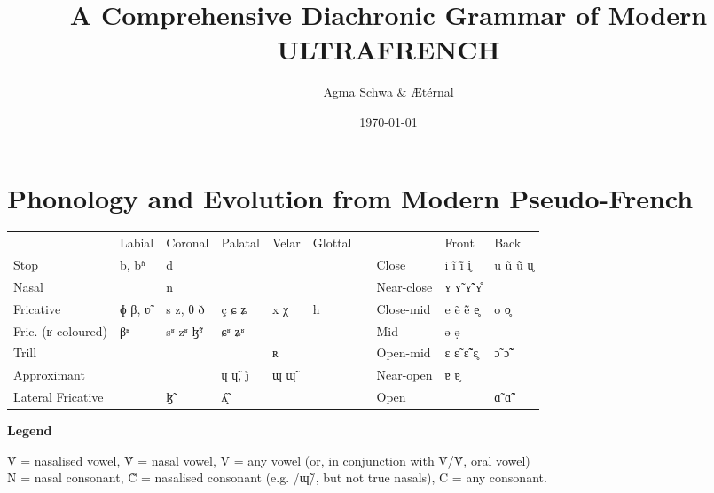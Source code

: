 \documentclass[a4paper, 12pt, oneside, final]{article}
\title{A Comprehensive Diachronic Grammar of Modern ULTRAFRENCH}
\author{Agma Schwa \& Ætérnal}
\date{\today}
\def\parheading#1{\noindent\textbf{#1}}
\let\Sub\textsubscript
\begin{document}
\maketitle
\thispagestyle{empty}
\clearpage
\setcounter{page}{1}

\tableofcontents
\clearpage

\section{Phonology and Evolution from Modern Pseudo-French}\label{sec:phonology}{\def\arraystretch{1.25}\setlength{\tabcolsep}{.4em}
\noindent\begin{tabular}{@{}|l|l|l|l|l|l|l@{\quad}|l|l|l|}                                                   \cline{1-6} \cline{8-10}
                       & Labial & Coronal  & Palatal  & Velar & Glottal &&            & Front        & Back        \\ \cline{1-6} \cline{8-10}
    Stop               & b, bʱ  & d        &          &       &         && Close      & i ĩ ĩ̃ i̥      & u ũ ũ̃ u̥ \\ \cline{1-6} \cline{8-10}
    Nasal              &        & n        &          &       &         && Near-close & ʏ ʏ̃ ʏ̃̃ ʏ̊      &             \\ \cline{1-6} \cline{8-10}
    Fricative          & ɸ β, ʋ̃ & s z, θ ð & ç ɕ ʑ    & x χ   & h       && Close-mid  & e ẽ ẽ̃ e̥      & o o̥         \\ \cline{1-6} \cline{8-10}
    Fric. (ʁ-coloured) & βʶ     & sʶ zʶ ɮ̃ʶ & ɕʶ ʑʶ    &       &         && Mid        & ə ə̣          &             \\\cline{1-6} \cline{8-10}
    Trill              &        &          &          & ʀ     &         && Open-mid   & ɛ ɛ̃ ɛ̃̃ ɛ̥      & ɔ̃ ɔ̃̃         \\ \cline{1-6} \cline{8-10}
    Approximant        &        &          & ɥ ɥ̃, j̊   & ɰ ɰ̃   &         && Near-open  & ɐ ɐ̥          &             \\ \cline{1-6} \cline{8-10}
    Lateral Fricative  &        & ɮ̃        & ʎ̝̃        &       &         && Open       &              & ɑ̃ ɑ̃̃         \\ \cline{1-6} \cline{8-10}
\end{tabular}}\bigskip

\parheading{Legend}\par\noindent
Ṽ = nasalised vowel, Ṽ̃ = nasal vowel, V = any vowel (or, in conjunction with Ṽ/Ṽ̃, oral vowel)\\
N = nasal consonant, C̃ = nasalised consonant (e.g. /ɰ̃/, but not true nasals), C = any consonant.\medskip
\def\scalpha{\kern-2pt\raisebox{2pt}{\Sub α}}
\end{document}
